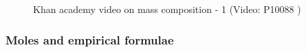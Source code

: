    \addtocounter{footnote}{-0}
    \par \label{m38712*eip-306}
    \setcounter{subfigure}{0}


	\begin{figure}[H] %
    
    
    \textnormal{Khan academy video on mass composition - 1}\vspace{.1in} \nopagebreak
  \label{m38712*yt-media3}\label{m38712*yt-video3}
             { (Video:  P10088 )}
      
      \vspace{2pt}
    \vspace{.1in}
    
    

 \end{figure}   

    \addtocounter{footnote}{-0}
    \par \label{m38712*secfhsst!!!underscore!!!id1437}
            \subsubsection{  Moles and empirical formulae
      }
            \nopagebreak
            
